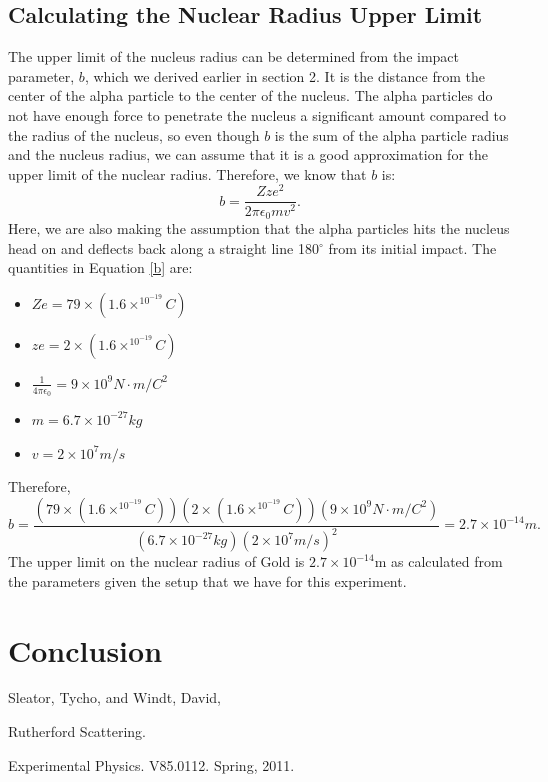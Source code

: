 \subsection{Calculating the Nuclear Radius Upper Limit}
The upper limit of the nucleus radius can be determined from the impact parameter, $b$, which we derived earlier in section 2. It is the distance from the center of the alpha particle to the center of the nucleus. The alpha particles do not have enough force to penetrate the nucleus a significant amount compared to the radius of the nucleus, so even though $b$ is the sum of the alpha particle radius and the nucleus radius, we can assume that it is a good approximation for the upper limit of the nuclear radius. Therefore, we know that $b$ is: \begin{equation} \label{b}b= \frac{Zze^2}{2\pi \epsilon_0 mv^2}.\end{equation} Here, we are also making the assumption that the alpha particles hits the nucleus head on and deflects back along a straight line 180$^\circ$ from its initial impact. The quantities in Equation \ref{b} are:
\begin{itemize}
\item $Ze=79\times (1.6\times^10^{-19} C)$
\item $ze= 2\times(1.6\times^10^{-19} C)$
\item $\frac{1}{4\pi\epsilon_0}=9\times10^9 N\cdot m/ C^2$
\item $m=6.7\times10^{-27} kg$
\item $v=2\times 10^7 m/s$
\end{itemize}
Therefore, \begin{equation} b= \frac{(79\times (1.6\times^10^{-19} C))(2\times(1.6\times^10^{-19} C))(9\times10^9 N\cdot m/ C^2)}{(6.7\times10^{-27} kg)(2\times 10^7 m/s)^2}=2.7\times10^{-14}m.\end{equation}
The upper limit on the nuclear radius of Gold is $2.7\times10^{-14}$m as calculated from the parameters given the setup that we have for this experiment.


\section{Conclusion}


\begin{thebibliography}{99}
Sleator, Tycho, and Windt, David, \begin{em}Rutherford Scattering. \end{em}Experimental Physics. V85.0112. Spring, 2011.
\end{thebibliography}

